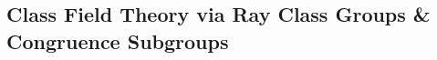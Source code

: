 \newpage
\subsection{Class Field Theory via Ray Class Groups \& Congruence Subgroups\label{sec:620_27}}